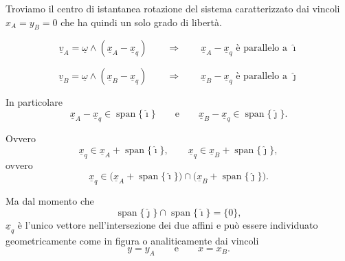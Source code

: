 \begin{examplebreak}{}
    Troviamo il centro di istantanea rotazione del sistema caratterizzato dai vincoli $x_A = y_B = 0$ che ha quindi un solo grado di libertà.
\begin{center}
\end{center}



\[
\underline{v}_A=\underline{\omega}\wedge(\underline{x}_A-\underline{x}_q)
\qquad\Rightarrow\qquad
\underline{x}_A-\underline{x}_q \text{ è parallelo a } \hat{\imath}
\]

\[
\underline{v}_B=\underline{\omega}\wedge(\underline{x}_B-\underline{x}_q)
\qquad\Rightarrow\qquad
\underline{x}_B-\underline{x}_q \text{ è parallelo a } \hat{\jmath}
\]

In particolare
\[
\underline{x}_A-\underline{x}_q\in \operatorname{span}\{\hat{\imath}\}
\qquad\text{e}\qquad
\underline{x}_B-\underline{x}_q\in \operatorname{span}\{\hat{\jmath}\}.
\]

Ovvero
\[
\underline{x}_q\in \underline{x}_A+\operatorname{span}\{\hat{\imath}\},
\qquad
\underline{x}_q\in \underline{x}_B+\operatorname{span}\{\hat{\jmath}\},
\]
ovvero
\[
\underline{x}_q\in
\bigl(\underline{x}_A+\operatorname{span}\{\hat{\imath}\}\bigr)
\cap
\bigl(\underline{x}_B+\operatorname{span}\{\hat{\jmath}\}\bigr).
\]

Ma dal momento che
\[
\operatorname{span}\{\hat{\jmath}\}\cap \operatorname{span}\{\hat{\imath}\}=\{0\},
\]
$\underline{x}_q$ è l'unico vettore nell'intersezione dei due affini e può essere individuato geometricamente come in figura o analiticamente dai vincoli
\[
y=y_A
\qquad\text{e}\qquad
x=x_B.
\]
\end{examplebreak}
